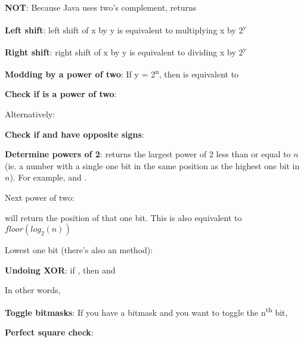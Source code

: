 
\textbf{NOT}: Because Java uses two's complement,  returns 

\textbf{Left shift}: left shift of x by y is equivalent to multiplying x by 2\textsuperscript{y}

\textbf{Right shift}: right shift of x by y is equivalent to dividing x by 2\textsuperscript{y}

\textbf{Modding by a power of two}: If y = 2\textsuperscript{n}, then  is equivalent to 

\textbf{Check if  is a power of two}: 

Alternatively: 

\textbf{Check if  and  have opposite signs}: 

\textbf{Determine powers of 2}:  returns the largest power of 2 less than or equal to $n$ (ie. a number with a single one bit in the same position as the highest one bit in $n$). For example,  and .

Next power of two: 

 will return the position of that one bit. This is also equivalent to $floor(log_2 (n))$

Lowest one bit (there's also an  method): 

\textbf{Undoing XOR}: if , then  and 

In other words, 

\textbf{Toggle bitmasks}: If you have a bitmask and you want to toggle the n\textsuperscript{th} bit, 

\textbf{Perfect square check}:






\newpage